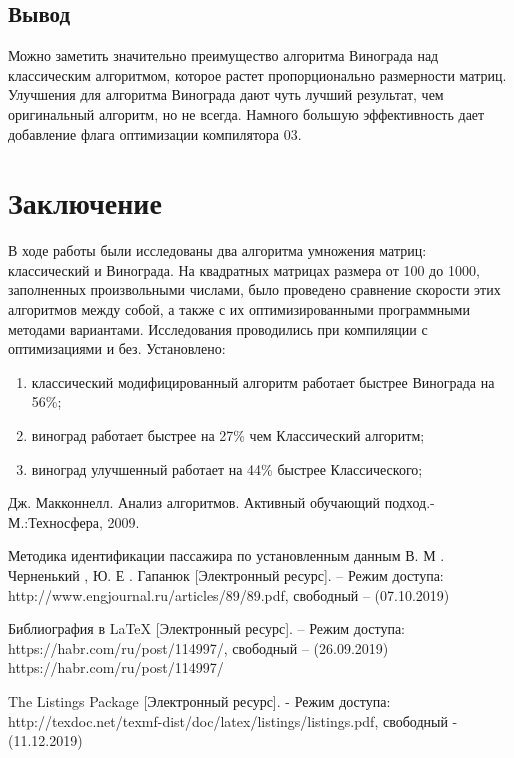 \documentclass[a4paper, 14pt]{article}
\begin{document}
	
	\newpage
	\subsection{Вывод}
	
	Можно заметить значительно преимущество алгоритма Винограда над классическим алгоритмом, которое растет пропорционально размерности матриц. Улучшения для алгоритма Винограда дают чуть лучший результат, чем оригинальный алгоритм, но не всегда.
	Намного большую эффективность дает добавление флага оптимизации компилятора 03.
	
	
	\newpage
	\section*{Заключение}
	
	В ходе работы были исследованы два алгоритма умножения матриц: классический и Винограда. На квадратных матрицах размера от 100 до 1000, заполненных произвольными числами, было проведено сравнение скорости этих алгоритмов между собой, а также с их оптимизированными программными методами вариантами. Исследования проводились при компиляции с оптимизациями и без. Установлено: 
	
	\begin{enumerate}
		\item классический модифицированный алгоритм работает быстрее Винограда на 56\%;
		\item виноград работает быстрее на 27\% чем Классический алгоритм;
		\item виноград улучшенный работает на 44\% быстрее Классического;
	\end{enumerate}
	
	\begin{thebibliography}{4}
		Дж. Макконнелл. Анализ алгоритмов. Активный обучающий подход.-
		М.:Техносфера, 2009.
		
		
		Методика идентификации пассажира по установленным данным В. М . Черненький , Ю. Е . Гапанюк [Электронный ресурс]. – Режим доступа: http://www.engjournal.ru/articles/89/89.pdf, свободный – (07.10.2019)
		
		Библиография в LaTeX [Электронный ресурс]. – Режим доступа: https://habr.com/ru/post/114997/, свободный – (26.09.2019)
		https://habr.com/ru/post/114997/
		
		The Listings Package [Электронный ресурс]. - Режим доступа: http://texdoc.net/texmf-dist/doc/latex/listings/listings.pdf, свободный - (11.12.2019)
		
	\end{thebibliography}
	
\end{document}
